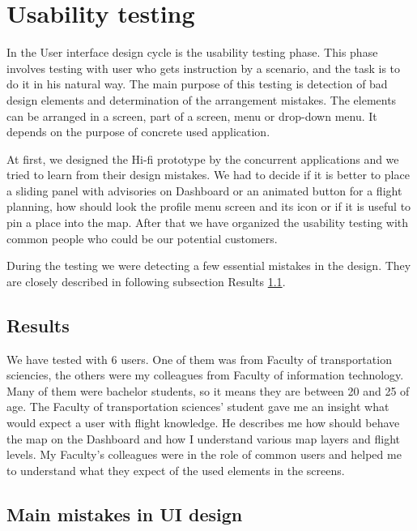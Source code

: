 \section{Usability testing}\label{sec:usability-testing}
In the User interface design cycle is the usability testing phase.
This phase involves testing with user who gets instruction by a scenario, and the task is to do it in his natural way.
The main purpose of this testing is detection of bad design elements and determination of the arrangement mistakes.
The elements can be arranged in a screen, part of a screen, menu or drop-down menu.
It depends on the purpose of concrete used application.

At first, we designed the Hi-fi prototype by the concurrent applications and we tried to learn from their design mistakes.
We had to decide if it is better to place a sliding panel with advisories on Dashboard or an animated button for a flight planning, how should look the profile menu screen and its icon or if it is useful to pin a place into the map.
After that we have organized the usability testing with common people who could be our potential customers.

During the testing we were detecting a few essential mistakes in the design.
They are closely described in following subsection Results \ref{subsec:results}.

\subsection{Results}\label{subsec:results}
We have tested with 6 users.
One of them was from Faculty of transportation sciencies, the others were my colleagues from Faculty of information technology.
Many of them were bachelor students, so it means they are between 20 and 25 of age.
The Faculty of transportation sciences' student gave me an insight what would expect a user with flight knowledge.
He describes me how should behave the map on the Dashboard and how I understand various map layers and flight levels.
My Faculty's colleagues were in the role of common users and helped me to understand what they expect of the used elements in the screens.

\subsection{Main mistakes in UI design}\label{subsec:main-mistakes-in-ui-design}
